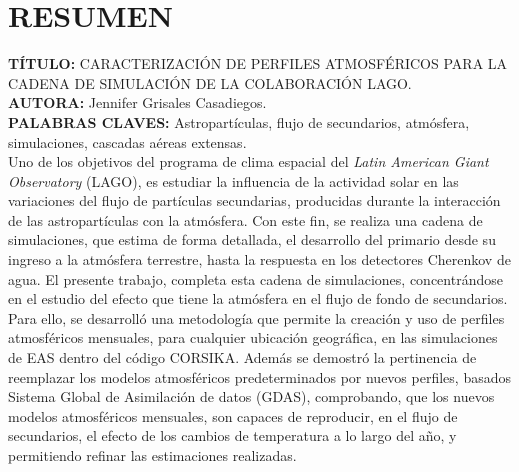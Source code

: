 \newpage
\chapter*{RESUMEN}
\label{sec:resum}

\textbf{TÍTULO:} CARACTERIZACIÓN DE PERFILES ATMOSFÉRICOS PARA LA CADENA DE SIMULACIÓN DE LA COLABORACIÓN LAGO.\\

\textbf{AUTORA:} Jennifer Grisales Casadiegos.\\

\textbf{PALABRAS CLAVES: } Astropartículas, flujo de secundarios, atmósfera, simulaciones, cascadas aéreas extensas.\\

Uno de los objetivos del programa de clima espacial del \textit{Latin American Giant Observatory} (LAGO), es estudiar la influencia de la actividad solar en las variaciones del flujo de partículas secundarias, producidas durante la interacción de las astropartículas con la atmósfera. Con este fin, se realiza una cadena de simulaciones, que estima de forma detallada, el desarrollo del primario desde su ingreso a la atmósfera terrestre, hasta la respuesta en los detectores Cherenkov de agua. El presente trabajo, completa esta cadena de simulaciones, concentrándose en el estudio del efecto que tiene la atmósfera en el flujo de fondo de secundarios. Para ello, se desarrolló una metodología que permite la creación y uso de perfiles atmosféricos mensuales, para cualquier ubicación geográfica, en las simulaciones de EAS dentro del código CORSIKA. Además se demostró la pertinencia de reemplazar los modelos atmosféricos predeterminados por nuevos perfiles, basados Sistema Global de Asimilación de datos (GDAS), comprobando, que los nuevos modelos atmosféricos mensuales, son capaces de reproducir, en el flujo de secundarios, el efecto de los cambios de temperatura a lo largo del año, y permitiendo refinar las estimaciones realizadas.
